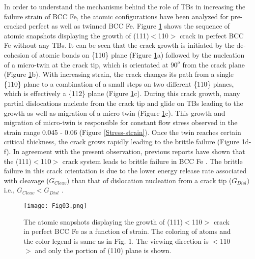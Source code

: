 \documentclass[smallextended]{svjour3}       %
\renewcommand\hl[1]{#1}
\begin{document}
In order to understand the mechanisms behind the role of TBs in increasing the failure strain of BCC Fe, the atomic configurations 
have been analyzed for pre-cracked perfect as well as twinned BCC Fe. Figure \ref{Perfect} shows the sequence of atomic snapshots 
displaying the growth of (111)$<$110$>$ crack in perfect BCC Fe without any TBs. It can be seen that the crack growth is initiated 
by the de-cohesion of atomic bonds on \{110\} plane (Figure \ref{Perfect}a) followed by the nucleation of a micro-twin at the crack 
tip, which is orientated at $90^o$ from the crack plane (Figure \ref{Perfect}b). With increasing strain, the crack changes its path 
from a single \{110\} plane to a combination of a small steps on two different \{110\} planes, which is effectively a \{112\} plane 
(Figure \ref{Perfect}c). During this crack growth, many partial dislocations nucleate from the crack tip and glide on TBs leading to 
the growth as well as migration of a micro-twin (Figure \ref{Perfect}c). This growth and migration of micro-twin is responsible for 
constant flow stress observed in the strain range 0.045 - 0.06 (Figure \ref{Stress-strain}). Once the twin reaches certain critical 
thickness, the crack grows rapidly leading to the brittle failure (Figure \ref{Perfect}d-f). In agreement with the present observation, 
previous reports have shown that the (111)$<$110$>$ crack system leads to brittle failure in BCC Fe \cite{gordon2007crack,al2016atomistic}. 
The brittle failure in this crack orientation is due to the lower energy release rate associated with cleavage ($G_{Cleav})$ than that 
of dislocation nucleation from a crack tip ($G_{Disl})$ i.e., $G_{Cleav} < G_{Disl}$ \cite{gordon2007crack}. 
  

\begin{figure}
\centering
\texttt{[image: Fig03.png]}
\caption {\small The atomic snapshots displaying the growth of (111)$<$110$>$ crack in perfect BCC Fe as a function of strain.
\hl{The coloring of atoms and the color legend is same as in Fig. 1. The viewing direction is $<$110$>$ and only the portion of (110) 
plane is shown.}}
\label{Perfect}
\end{figure}
\end{document}
